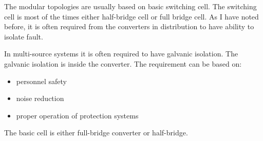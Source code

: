 \documentclass[]{scrartcl}
\begin{document}
The modular topologies are usually based on basic switching cell. The switching cell is most of the times either half-bridge cell or full bridge cell. As I have noted before, it is often required from the converters in distribution to have ability to isolate fault. 

In multi-source systems it is often required to have galvanic isolation. The galvanic isolation is inside the converter. The requirement can be based on\cite{Karshenas2011}: 
\begin{itemize}
	\item personnel safety 
	\item noise reduction
	\item proper operation of protection systems
\end{itemize}

The basic cell is either full-bridge converter or half-bridge. 
\end{document}

